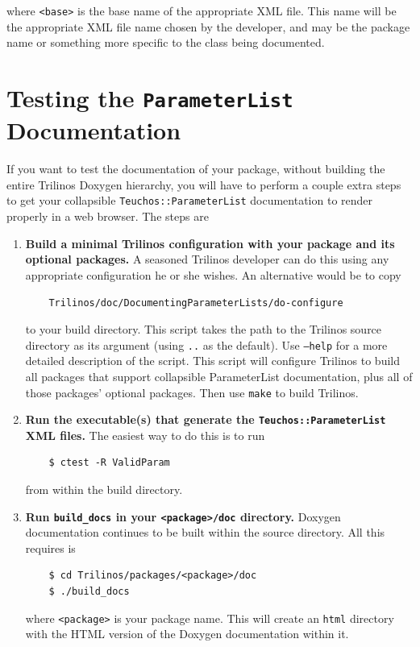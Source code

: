 \documentclass[pdf,ps2pdf,12pt]{smemo}
\begin{document}
\begin{memo}
\begin{enumerate}
 where \texttt{<base>} is the base name of the appropriate XML file.
 This name will be the appropriate XML file name chosen by the
 developer, and may be the package name or something more specific to
 the class being documented.

\end{enumerate}

\section{Testing the \texttt{ParameterList} Documentation}
\label{sec:testing}

If you want to test the documentation of your package, without
building the entire Trilinos Doxygen hierarchy, you will have to
perform a couple extra steps to get your collapsible
\texttt{Teuchos::ParameterList} documentation to render properly in a
web browser.  The steps are

 \begin{enumerate}
   \item \textbf{Build a minimal Trilinos configuration with your
       package and its optional packages.}  A seasoned Trilinos
     developer can do this using any appropriate configuration he or she
     wishes.  An alternative would be to copy
\begin{verbatim}
    Trilinos/doc/DocumentingParameterLists/do-configure
\end{verbatim}
     to your build directory.  This script takes the path to the
     Trilinos source directory as its argument (using \texttt{..} as
     the default).  Use \texttt{--help} for a more detailed
     description of the script.  This script will configure Trilinos
     to build all packages that support collapsible ParameterList
     documentation, plus all of those packages' optional packages.
     Then use \texttt{make} to build Trilinos.

    \item \textbf{Run the executable(s) that generate the
        \texttt{Teuchos::ParameterList} XML files.}  The easiest way to
      do this is to run
\begin{verbatim}
    $ ctest -R ValidParam
\end{verbatim}
      from within the build directory.

    \item \textbf{Run \texttt{build\_docs} in your
        \texttt{<package>/doc} directory.}  Doxygen documentation
      continues to be built within the source directory.  All this
      requires is
\begin{verbatim}
    $ cd Trilinos/packages/<package>/doc
    $ ./build_docs
\end{verbatim}
      where \texttt{<package>} is your package name.  This will create
      an \texttt{html} directory with the HTML version of the Doxygen
      documentation within it.


\end{enumerate}
\end{memo}
\end{document}
